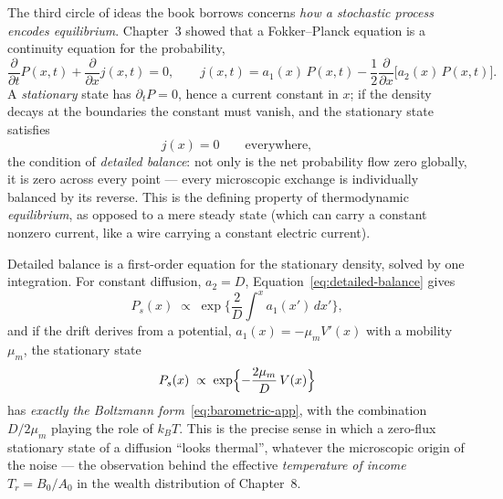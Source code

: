 The third circle of ideas the book borrows concerns \emph{how a stochastic process encodes equilibrium}.
Chapter~3 showed that a Fokker--Planck equation is a continuity equation for the probability,
\begin{equation}\label{eq:fp-continuity-app}
\frac{\partial}{\partial t}P(x,t) + \frac{\partial}{\partial x}j(x,t) = 0,
\qquad
j(x,t) = a_1(x)\,P(x,t) - \frac{1}{2}\frac{\partial}{\partial x}\bigl[a_2(x)\,P(x,t)\bigr].
\end{equation}
A \emph{stationary} state has $\partial_t P = 0$, hence a current constant in $x$; if the density decays at the boundaries the constant must vanish, and the stationary state satisfies
\begin{equation}\label{eq:detailed-balance}
j(x) = 0 \qquad \text{everywhere},
\end{equation}
the condition of \emph{detailed balance}: not only is the net probability flow zero globally, it is zero across every point --- every microscopic exchange is individually balanced by its reverse.
This is the defining property of thermodynamic \emph{equilibrium}, as opposed to a mere steady state (which can carry a constant nonzero current, like a wire carrying a constant electric current).

Detailed balance is a first-order equation for the stationary density, solved by one integration.
For constant diffusion, $a_2 = D$, Equation~\eqref{eq:detailed-balance} gives
\begin{equation}\label{eq:stationary-solution}
P_s(x) \;\propto\; \exp\biggl\{\frac{2}{D}\int^x a_1(x')\,dx'\biggr\},
\end{equation}
and if the drift derives from a potential, $a_1(x) = -\mu_m V'(x)$ with a mobility $\mu_m$, the stationary state
\begin{equation}\label{eq:boltzmann-from-fp}
P_s(x) \;\propto\; \exp\Bigl\{-\frac{2\mu_m}{D}\,V(x)\Bigr\}
\end{equation}
has \emph{exactly the Boltzmann form}~\eqref{eq:barometric-app}, with the combination $D/2\mu_m$ playing the role of $k_B T$.
This is the precise sense in which a zero-flux stationary state of a diffusion ``looks thermal'', whatever the microscopic origin of the noise --- the observation behind the effective \emph{temperature of income} $T_r = B_0/A_0$ in the wealth distribution of Chapter~8.

\medskip

